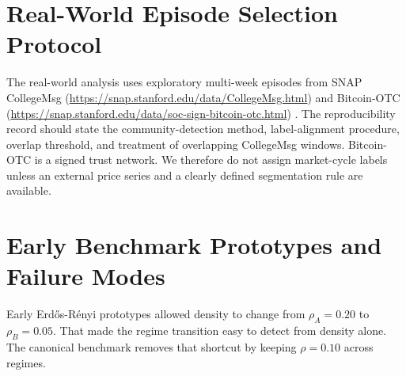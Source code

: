\documentclass[conference]{IEEEtran}
\begin{document}
\section{Real-World Episode Selection Protocol}
The real-world analysis uses exploratory multi-week episodes from SNAP CollegeMsg (\url{https://snap.stanford.edu/data/CollegeMsg.html}) and Bitcoin-OTC (\url{https://snap.stanford.edu/data/soc-sign-bitcoin-otc.html}) \cite{panzarasa2009patterns, kumar2016edge}. The reproducibility record should state the community-detection method, label-alignment procedure, overlap threshold, and treatment of overlapping CollegeMsg windows. Bitcoin-OTC is a signed trust network. We therefore do not assign market-cycle labels unless an external price series and a clearly defined segmentation rule are available.

\section{Early Benchmark Prototypes and Failure Modes}
Early Erd\H{o}s-R\'enyi prototypes allowed density to change from $\rho_A=0.20$ to $\rho_B=0.05$. That made the regime transition easy to detect from density alone. The canonical benchmark removes that shortcut by keeping $\rho=0.10$ across regimes.
\end{document}

